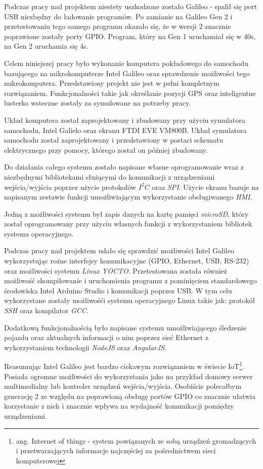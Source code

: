 \documentclass{xmgr}
\begin{document}
Podczas pracy nad projektem niestety uszkodzone zostało Galileo - spalił się port USB niezbędny do ładowanie programów. Po zamianie na Galileo Gen 2 i przetestowaniu tego samego programu okazało się, że w wersji 2 znacznie poprawione zostały porty GPIO. Program, który na Gen 1 uruchamiał się w 40s, na Gen 2 uruchamia się 4s.

\summary
Celem niniejszej pracy było wykonanie komputera pokładowego do samochodu bazującego na mikrokomputerze Intel Galileo oraz sprawdzenie możliwości tego mikrokomputera. Przedstawiony projekt nie jest w pełni kompletnym rozwiązaniem. Funkcjonalności takie jak określanie pozycji GPS oraz inteligentne lusterko wsteczne zostały za symulowane na potrzeby pracy.

Układ komputera został zaprojektowany i zbudowany przy użyciu symulatora samochodu, Intel Galielo oraz ekranu FTDI EVE VM800B. Układ symulatora samochodu został zaprojektowany i przedstawiony w postaci schematu elektrycznego przy pomocy, którego został on później zbudowany. 

Do działania całego systemu zostało napisane własne oprogramowanie wraz z niezbędnymi bibliotekami służącymi do komunikacji z urządzeniami wejścia/wyjścia poprzez użycie protokołów $I^2C$ oraz \emph{SPI}. Użycie ekranu bazuje na napisanym zestawie funkcji umożliwiającym wykorzystanie obsługiwanego \emph{HMI}.

Jedną z możliwości systemu był zapis danych na kartę pamięci \emph{microSD}, który został oprogramowany przy użyciu własnych funkcji z wykorzystaniem bibliotek systemu operacyjnego. 

Podczas pracy nad projektem udało się sprawdzić możliwości Intel Galileo wykorzystując rożne interfejsy komunikacyjne (GPIO, Ethernet, USB, RS-232) oraz możliwości systemu \emph{Linux YOCTO}. Przetestowana została również możliwość skompilowanie i uruchomienia programu z pominięciem standardowego środowiska Intel Arduino Studio i komunikacji poprzez USB. W tym celu wykorzystane zostały możliwośći systemu operacyjnego Linux takie jak: protokół \emph{SSH} oraz kompilator \emph{GCC}. 

Dodatkową funkcjonalnością było napisane systemu umożliwiającego śledzenie pojazdu oraz aktualnych informacji o nim poprzez sieć Ethernet z wykorzystaniem technologii \emph{NodeJS} oraz \emph{AngularJS}.

Reasumując Intel Galileo jest bardzo ciekawym rozwiązaniem w świecie IoT\footnote{ang. Internet of things - system powiązanych ze sobą urządzeń gromadzących i przetwarzających informacje najczęściej za pośrednictwem sieci komputerowej}. Posiada ogromne możliwości do wykorzystania jako na przykład domowy serwer multimedialny lub kontroler urządzeń wejścia/wyjścia. Osobiście polecałbym generację 2 ze względu na poprawioną obsługę portów GPIO co znacznie ułatwia korzystanie z nich i znacznie wpływa na wydajność komunikacji pomiędzy urządzeniami.
\end{document}
